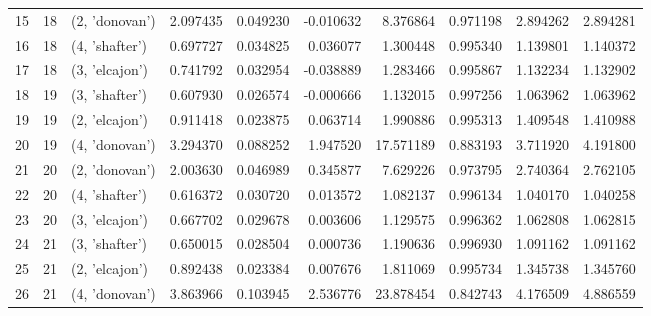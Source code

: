 \begin{tabular}{lrlrrrrrrr}
15 &     18 &  (2, 'donovan') &  2.097435 &  0.049230 & -0.010632 &   8.376864 &  0.971198 &  2.894262 &  2.894281 \\
16 &     18 &  (4, 'shafter') &  0.697727 &  0.034825 &  0.036077 &   1.300448 &  0.995340 &  1.139801 &  1.140372 \\
17 &     18 &  (3, 'elcajon') &  0.741792 &  0.032954 & -0.038889 &   1.283466 &  0.995867 &  1.132234 &  1.132902 \\
18 &     19 &  (3, 'shafter') &  0.607930 &  0.026574 & -0.000666 &   1.132015 &  0.997256 &  1.063962 &  1.063962 \\
19 &     19 &  (2, 'elcajon') &  0.911418 &  0.023875 &  0.063714 &   1.990886 &  0.995313 &  1.409548 &  1.410988 \\
20 &     19 &  (4, 'donovan') &  3.294370 &  0.088252 &  1.947520 &  17.571189 &  0.883193 &  3.711920 &  4.191800 \\
21 &     20 &  (2, 'donovan') &  2.003630 &  0.046989 &  0.345877 &   7.629226 &  0.973795 &  2.740364 &  2.762105 \\
22 &     20 &  (4, 'shafter') &  0.616372 &  0.030720 &  0.013572 &   1.082137 &  0.996134 &  1.040170 &  1.040258 \\
23 &     20 &  (3, 'elcajon') &  0.667702 &  0.029678 &  0.003606 &   1.129575 &  0.996362 &  1.062808 &  1.062815 \\
24 &     21 &  (3, 'shafter') &  0.650015 &  0.028504 &  0.000736 &   1.190636 &  0.996930 &  1.091162 &  1.091162 \\
25 &     21 &  (2, 'elcajon') &  0.892438 &  0.023384 &  0.007676 &   1.811069 &  0.995734 &  1.345738 &  1.345760 \\
26 &     21 &  (4, 'donovan') &  3.863966 &  0.103945 &  2.536776 &  23.878454 &  0.842743 &  4.176509 &  4.886559 \\
\bottomrule
\end{tabular}

